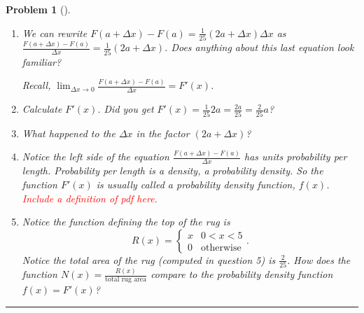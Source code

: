 \documentclass[letterpaper,oneside]{book}%
\theoremstyle{plain}
\theoremstyle{box}
\theoremstyle{problem}
\newtheorem{problemnum}{Problem}[chapter]
\newenvironment{problem}[1][]{\begin{problemnum}[#1]}{\end{problemnum}\nopagebreak\hrule\bigskip}
\begin{document}
\begin{problem}
\begin{enumerate}
  Since $P(a \leq X \leq a +\Delta x) = F(a + \Delta x) - F(a)$ we can rewrite this equation as $F(a + \Delta x) - F(a) = \frac{1}{25} (2a + \Delta x) \Delta x$. Notice this last equation is almost a linearization of the cdf, $F(x)$, at $x = a$.
  \item We can rewrite $F(a + \Delta x) - F(a) = \frac{1}{25} (2a + \Delta x) \Delta x$ as $\frac{F(a + \Delta x) - F(a)}{\Delta x} = \frac{1}{25} (2a + \Delta x)$. Does anything about this last equation look familiar?
  
  Recall, $\lim_{\Delta x \rightarrow 0}\frac{F(a + \Delta x) - F(a)}{\Delta x} = F'(x)$.
  \item Calculate $F'(x)$. Did you get $F'(x) = \frac{1}{25}2a = \frac{2a}{25} = \frac{2}{25} a$?
 
  \item What happened to the $\Delta x$ in the factor $(2a + \Delta x)$?
  \item Notice the left side of the equation $\frac{F(a + \Delta x) - F(a)}{\Delta x}$ has units probability per length. Probability per length is a density, a probability density. So the function $F'(x)$ is usually called a probability density function, $f(x)$. 
  \textcolor{red}{Include a definition of pdf here.}
  \item Notice the function defining the top of the rug is       
  $$R(x) = 
    \begin{cases}
    x & 0 < x < 5 \\
    0 & \text{otherwise}
    \end{cases}.$$
  Notice the total area of the rug (computed in question 5) is $\frac{2}{25}$. How does the function $N(x) = \frac{R(x)}{\text{total rug area}}$ compare to the probability density function $f(x) = F'(x)$?
    

\end{enumerate}
\end{problem}
\end{document}

